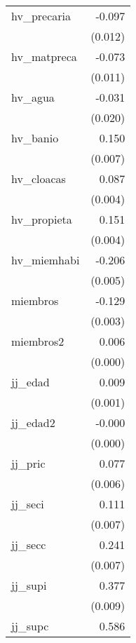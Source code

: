 {\begin{longtable}{l*{1}{D{.}{.}{-1}}}
\addlinespace
hv\_precaria &      -0.097\sym{***}\\
            &     (0.012)         \\
\addlinespace
hv\_matpreca &      -0.073\sym{***}\\
            &     (0.011)         \\
\addlinespace
hv\_agua     &      -0.031         \\
            &     (0.020)         \\
\addlinespace
hv\_banio    &       0.150\sym{***}\\
            &     (0.007)         \\
\addlinespace
hv\_cloacas  &       0.087\sym{***}\\
            &     (0.004)         \\
\addlinespace
hv\_propieta &       0.151\sym{***}\\
            &     (0.004)         \\
\addlinespace
hv\_miemhabi &      -0.206\sym{***}\\
            &     (0.005)         \\
\addlinespace
miembros    &      -0.129\sym{***}\\
            &     (0.003)         \\
\addlinespace
miembros2   &       0.006\sym{***}\\
            &     (0.000)         \\
\addlinespace
jj\_edad     &       0.009\sym{***}\\
            &     (0.001)         \\
\addlinespace
jj\_edad2    &      -0.000\sym{***}\\
            &     (0.000)         \\
\addlinespace
jj\_pric     &       0.077\sym{***}\\
            &     (0.006)         \\
\addlinespace
jj\_seci     &       0.111\sym{***}\\
            &     (0.007)         \\
\addlinespace
jj\_secc     &       0.241\sym{***}\\
            &     (0.007)         \\
\addlinespace
jj\_supi     &       0.377\sym{***}\\
            &     (0.009)         \\
\addlinespace
jj\_supc     &       0.586\sym{***}\\

\end{longtable}}
